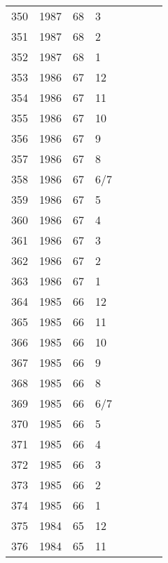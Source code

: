 \begin{longtable}{ |l|l|l|l|l|l|l|l| }
350 & 1987 & 68 &     3 &         &                &  & \\
351 & 1987 & 68 &     2 &         &                &  & \\
352 & 1987 & 68 &     1 &         &                &  & \\
353 & 1986 & 67 &    12 &         &                &  & \\
354 & 1986 & 67 &    11 &         &                &  & \\
355 & 1986 & 67 &    10 &         &                &  & \\
356 & 1986 & 67 &     9 &         &                &  & \\
357 & 1986 & 67 &     8 &         &                &  & \\
358 & 1986 & 67 &   6/7 &         &                &  & \\
359 & 1986 & 67 &     5 &         &                &  & \\
360 & 1986 & 67 &     4 &         &                &  & \\
361 & 1986 & 67 &     3 &         &                &  & \\
362 & 1986 & 67 &     2 &         &                &  & \\
363 & 1986 & 67 &     1 &         &                &  & \\
364 & 1985 & 66 &    12 &         &                &  & \\
365 & 1985 & 66 &    11 &         &                &  & \\
366 & 1985 & 66 &    10 &         &                &  & \\
367 & 1985 & 66 &     9 &         &                &  & \\
368 & 1985 & 66 &     8 &         &                &  & \\
369 & 1985 & 66 &   6/7 &         &                &  & \\
370 & 1985 & 66 &     5 &         &                &  & \\
371 & 1985 & 66 &     4 &         &                &  & \\
372 & 1985 & 66 &     3 &         &                &  & \\
373 & 1985 & 66 &     2 &         &                &  & \\
374 & 1985 & 66 &     1 &         &                &  & \\
375 & 1984 & 65 &    12 &         &                &  & \\
376 & 1984 & 65 &    11 &         &                &  & \\

\end{longtable}
